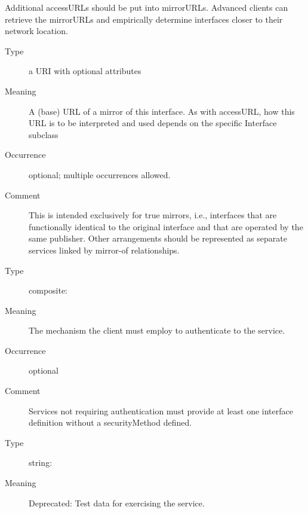 \documentclass[11pt,a4paper]{ivoa}
\begin{document}
\begin{generated}
\begin{bigdescription}
\begin{description}
                 Additional accessURLs should be put into mirrorURLs.
                 Advanced clients can retrieve the mirrorURLs and
                 empirically determine interfaces closer to their
                 network location.


\end{description}
\item[Element \xmlel{mirrorURL}]
\begin{description}
\item[Type] a URI with optional attributes
\item[Meaning]
                 A (base) URL of a mirror of this interface.  As with
                 accessURL, how this URL is to be interpreted and used
                 depends on the specific Interface subclass

\item[Occurrence] optional; multiple occurrences allowed.
\item[Comment]
                This is intended exclusively for true mirrors, i.e.,
                interfaces that are functionally identical to the
                original interface and that are operated by the same
                publisher.  Other arrangements should be represented as
                separate services linked by mirror-of relationships.


\end{description}
\item[Element \xmlel{securityMethod}]
\begin{description}
\item[Type] composite: 
\item[Meaning]
                  The mechanism the client must employ to authenticate
                  to the service.

\item[Occurrence] optional
\item[Comment]
                  Services not requiring authentication must provide
                  at least one interface definition without a
                  securityMethod defined.


\end{description}
\item[Element \xmlel{testQueryString}]
\begin{description}
\item[Type] string: 
\item[Meaning]
                  Deprecated: Test data for exercising the service.


\end{description}
\end{bigdescription}
\end{generated}
\end{document}
